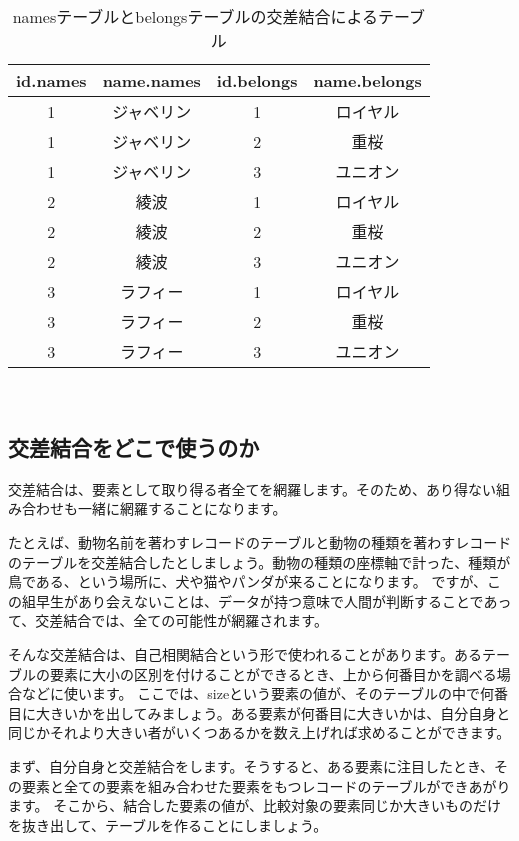 \begin{table}[htb]
  \begin{tabular}{|c|c|c|c|} \hline
    id.names & name.names & id.belongs & name.belongs \\ \hline
    1 & ジャベリン & 1 & ロイヤル \\
    1 & ジャベリン & 2 & 重桜 \\
    1 & ジャベリン & 3 & ユニオン \\
    2 & 綾波 & 1 & ロイヤル \\
    2 & 綾波 & 2 & 重桜 \\
    2 & 綾波 & 3 & ユニオン \\
    3 & ラフィー & 1 & ロイヤル \\
    3 & ラフィー & 2 & 重桜 \\
    3 & ラフィー & 3 & ユニオン \\ \hline
  \end{tabular}
　　\label{table:belongs}
　　\caption{namesテーブルとbelongsテーブルの交差結合によるテーブル}
\end{table}


\subsection{交差結合をどこで使うのか}

交差結合は、要素として取り得る者全てを網羅します。そのため、あり得ない組み合わせも一緒に網羅することになります。

たとえば、動物名前を著わすレコードのテーブルと動物の種類を著わすレコードのテーブルを交差結合したとしましょう。動物の種類の座標軸で計った、種類が鳥である、という場所に、犬や猫やパンダが来ることになります。
ですが、この組早生があり会えないことは、データが持つ意味で人間が判断することであって、交差結合では、全ての可能性が網羅されます。

そんな交差結合は、自己相関結合という形で使われることがあります。あるテーブルの要素に大小の区別を付けることができるとき、上から何番目かを調べる場合などに使います。
ここでは、sizeという要素の値が、そのテーブルの中で何番目に大きいかを出してみましょう。ある要素が何番目に大きいかは、自分自身と同じかそれより大きい者がいくつあるかを数え上げれば求めることができます。

まず、自分自身と交差結合をします。そうすると、ある要素に注目したとき、その要素と全ての要素を組み合わせた要素をもつレコードのテーブルができあがります。
そこから、結合した要素の値が、比較対象の要素同じか大きいものだけを抜き出して、テーブルを作ることにしましょう。

